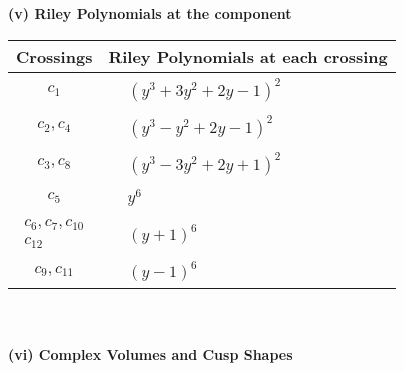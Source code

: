 \documentclass[1p]{elsarticle_modified}
\theoremstyle{definition}
\begin{document}
\newpage\renewcommand{\arraystretch}{1}
\flushleft \textbf{(v) Riley Polynomials at the component}\newline \\
\begin{tabular}{m{50pt}|m{274pt}}
Crossings & \hspace{64pt}Riley Polynomials at each crossing \\
\hline $$\begin{aligned}c_{1}\end{aligned}$$&$\begin{aligned}
&(y^3+3 y^2+2 y-1)^2
\end{aligned}$\\
\hline $$\begin{aligned}c_{2},c_{4}\end{aligned}$$&$\begin{aligned}
&(y^3- y^2+2 y-1)^2
\end{aligned}$\\
\hline $$\begin{aligned}c_{3},c_{8}\end{aligned}$$&$\begin{aligned}
&(y^3-3 y^2+2 y+1)^2
\end{aligned}$\\
\hline $$\begin{aligned}c_{5}\end{aligned}$$&$\begin{aligned}
&y^6
\end{aligned}$\\
\hline $$\begin{aligned}c_{6},c_{7},c_{10}\\c_{12}\end{aligned}$$&$\begin{aligned}
&(y+1)^6
\end{aligned}$\\
\hline $$\begin{aligned}c_{9},c_{11}\end{aligned}$$&$\begin{aligned}
&(y-1)^6
\end{aligned}$\\
\hline
\end{tabular}\\~\\
\newpage\flushleft \textbf{(vi) Complex Volumes and Cusp Shapes}
\end{document}
